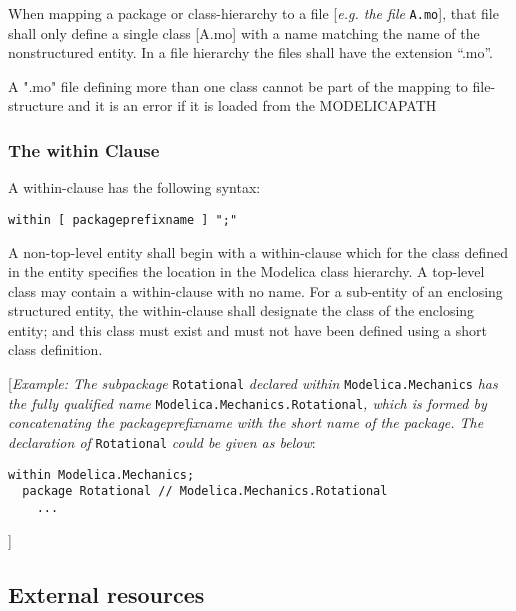 When mapping a package or class-hierarchy to a file {[}\emph{e.g. the
  file} \lstinline[basicstyle=\ttfamily]!A.mo!{]}, that file shall only define a single class {[}A.mo{]} with a
name matching the name of the nonstructured entity. In a file hierarchy
the files shall have the extension ``.mo''.

A ".mo" file defining more than one class cannot be part of the mapping
to file-structure and it is an error if it is loaded from the
MODELICAPATH

\subsubsection{The within Clause}

A within-clause has the following syntax:

\begin{lstlisting}[language=grammar]
  within [ packageprefixname ] ";"
\end{lstlisting}
  A non-top-level entity shall begin with a within-clause which for the
  class defined in the entity specifies the location in the Modelica class
    hierarchy. A top-level class may contain a within-clause with no name.
    For a sub-entity of an enclosing structured entity, the within-clause
shall designate the class of the enclosing entity; and this class must
exist and must not have been defined using a short class definition.

{[}\emph{Example: The subpackage} \lstinline[basicstyle=\ttfamily]!Rotational! \emph{declared within}
\lstinline[basicstyle=\ttfamily]!Modelica.Mechanics! \emph{has the fully qualified name}
\lstinline[basicstyle=\ttfamily]!Modelica.Mechanics.Rotational!\emph{, which is formed by concatenating
the packageprefixname with the short name of the package. The
declaration of} \lstinline[basicstyle=\ttfamily]!Rotational! \emph{could be given as below}:

\begin{lstlisting}[language=modelica]
  within Modelica.Mechanics;
  package Rotational // Modelica.Mechanics.Rotational
    ...
\end{lstlisting}
{]}

\subsection{External resources}

